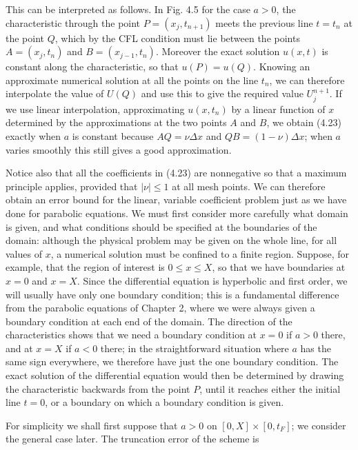 \documentclass[10pt]{article}
\begin{document}
This can be interpreted as follows. In Fig. 4.5 for the case \(a>0\), the characteristic through the point \(P=\left(x_{j}, t_{n+1}\right)\) meets the previous line \(t=t_{n}\) at the point \(Q\), which by the CFL condition must lie between the points \(A=\left(x_{j}, t_{n}\right)\) and \(B=\left(x_{j-1}, t_{n}\right)\). Moreover the exact solution \(u(x, t)\) is constant along the characteristic, so that \(u(P)=u(Q)\). Knowing an approximate numerical solution at all the points on the line \(t_{n}\), we can therefore interpolate the value of \(U(Q)\) and use this to give the required value \(U_{j}^{n+1}\). If we use linear interpolation, approximating \(u\left(x, t_{n}\right)\) by a linear function of \(x\) determined by the approximations at the two points \(A\) and \(B\), we obtain (4.23) exactly when \(a\) is constant because \(A Q=\nu \Delta x\) and \(Q B=(1-\nu) \Delta x\); when \(a\) varies smoothly this still gives a good approximation.

Notice also that all the coefficients in (4.23) are nonnegative so that a maximum principle applies, provided that \(|\nu| \leq 1\) at all mesh points. We can therefore obtain an error bound for the linear, variable coefficient problem just as we have done for parabolic equations. We must first consider more carefully what domain is given, and what conditions should be specified at the boundaries of the domain: although the physical problem may be given on the whole line, for all values of \(x\), a numerical solution must be confined to a finite region. Suppose, for example, that the region of interest is \(0 \leq x \leq X\), so that we have boundaries at \(x=0\) and \(x=X\). Since the differential equation is hyperbolic and first order, we will usually have only one boundary condition; this is a fundamental difference from the parabolic equations of Chapter 2, where we were always given a boundary condition at each end of the domain. The direction of the characteristics shows that we need a boundary condition at \(x=0\) if \(a>0\) there, and at \(x=X\) if \(a<0\) there; in the straightforward situation where \(a\) has the same sign everywhere, we therefore have just the one boundary condition. The exact solution of the differential equation would then be determined by drawing the characteristic backwards from the point \(P\), until it reaches either the initial line \(t=0\), or a boundary on which a boundary condition is given.

For simplicity we shall first suppose that \(a>0\) on \([0, X] \times\left[0, t_{F}\right]\); we consider the general case later. The truncation error of the scheme is
\end{document}
